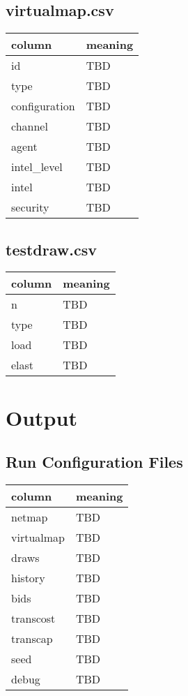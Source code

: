 \documentclass[12pt]{article}
\begin{document}
\subsection{virtualmap.csv}

\begin{tabular} {| l | l |}
    \hline
    \textbf{column} & \textbf{meaning} \\ \hline
    id & TBD \\ \hline
    type & TBD \\ \hline
    configuration & TBD \\ \hline
    channel & TBD \\ \hline
    agent & TBD \\ \hline
    intel\_level & TBD \\ \hline
    intel & TBD \\ \hline
    security & TBD \\ \hline
\end{tabular}

\subsection{testdraw.csv}

\begin{tabular} {| l | l |}
    \hline
    \textbf{column} & \textbf{meaning} \\ \hline
    n & TBD \\ \hline
    type & TBD \\ \hline
    load & TBD \\ \hline
    elast & TBD \\ \hline
\end{tabular}

\section{Output}

\subsection{Run Configuration Files}

\begin{tabular} {| l | l |}
    \hline
    \textbf{column} & \textbf{meaning} \\ \hline
    netmap & TBD \\ \hline
    virtualmap & TBD \\ \hline
    draws & TBD \\ \hline
    history & TBD \\ \hline
    bids & TBD \\ \hline
    transcost & TBD \\ \hline
    transcap & TBD \\ \hline
    seed & TBD \\ \hline
    debug & TBD \\ \hline
\end{tabular}
\end{document}
